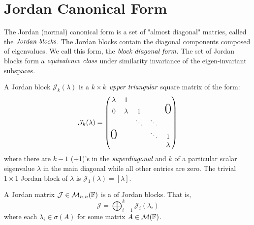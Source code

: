 
\section{Jordan Canonical Form} %
\label{sec:JordanForm}

The Jordan (normal) canonical form is a set of "almost diagonal"
matries, called the $\emph{Jordan blocks}$. The Jordan blocks
contain the diagonal components composed of eigenvalues. We call
this form, the $\emph{block diagonal form}$. The set of Jordan
blocks form a $\emph{equivalence class}$ under similarity invariance
of the eigen-invariant subspaces.

\begin{defn}
	A Jordan block $\mathcal{J}_k(\lambda)$ is a $k \times k$
	$\emph{upper triangular}$ square matrix of the form:
	\[
		\mathcal{J}_k(\lambda) =
		\begin{pmatrix}
			\lambda & 1 & & & \\
			0 & \lambda & 1 & & \text{\huge{0}} \\
			& & \ddots & \ddots & \\
			\text{\huge{0}} & & & \ddots & 1 \\
			& & & & \lambda
		\end{pmatrix}
	\]
	where there are $k-1$ (+1)'s in the $\emph{superdiagonal}$ and
	$k$ of a particular scalar eigenvalue $\lambda$ in the main
	diagonal while all other entries are zero. The trivial $1 \times 1$
	Jordan block of $\lambda$ is $\mathcal{J}_1(\lambda)=[\lambda]$.
\end{defn}

\begin{defn}
	A Jordan matrix $\mathcal{J} \in \mathcal{M}_{n,n}(\mathbb{F})$ is a
	 of Jordan blocks. That is,
	\[
		\mathcal{J} =
		\bigoplus_{i=1}^{k} \mathcal{J}_i(\lambda_i)
	\]
	where each $\lambda_i \in \sigma(A)$ for some matrix $A \in \mathcal{M}(\mathbb{F})$.
\end{defn}
